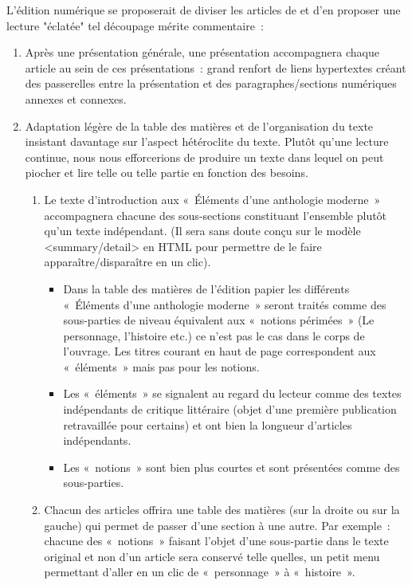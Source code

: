 \documentclass[12pt, a4paper]{article}
\begin{document}
L'édition numérique se proposerait de diviser les articles de \punr{} et d'en proposer une lecture "éclatée" tel découpage mérite commentaire~: 
\begin{enumerate}
    \item Après une présentation générale, une présentation accompagnera chaque article au sein de ces présentations~: grand renfort de liens hypertextes créant des passerelles entre la présentation et des paragraphes/sections numériques annexes et connexes.
    \item Adaptation légère de la table des matières et de l'organisation du texte insistant davantage sur l'aspect hétéroclite du texte. Plutôt qu'une lecture continue, nous nous efforcerions de produire un texte dans lequel on peut piocher et lire telle ou telle partie en fonction des besoins.
    \begin{enumerate}
        \item Le texte d'introduction aux «~Éléments d'une anthologie moderne~» accompagnera chacune des sous-sections constituant l'ensemble plutôt qu'un texte indépendant. (Il sera sans doute conçu sur le modèle <summary/detail> en HTML pour permettre de le faire apparaître/disparaître en un clic).
        \begin{itemize}
             \item Dans la table des matières de l'édition papier les différents «~Éléments d'une anthologie moderne~» seront traités comme des sous-parties de niveau équivalent aux «~notions périmées~» (Le personnage, l'histoire etc.) ce n'est pas le cas dans le corps de l'ouvrage. Les titres courant en haut de page correspondent aux «~éléments~» mais pas pour les notions.
            \item Les «~éléments~» se signalent au regard du lecteur comme des textes indépendants de critique littéraire (objet d'une première publication retravaillée pour certains) et ont bien la longueur d'articles indépendants.
            \item Les «~notions~» sont bien plus courtes et sont présentées comme des sous-parties.
        \end{itemize}
        \item Chacun des articles offrira une table des matières (sur la droite ou sur la gauche) qui permet de passer d'une section à une autre. Par exemple~: chacune des «~notions~» faisant l'objet d'une sous-partie dans le texte original et non d'un article sera conservé telle quelles, un petit menu permettant d'aller en un clic de «~personnage~» à «~histoire~».

\end{enumerate}
\end{enumerate}
\end{document}
